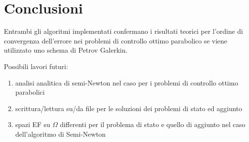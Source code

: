 \documentclass{beamer}
\theoremstyle{definition}
\theoremstyle{remark}
\theoremstyle{plain}
\theoremstyle{definition}
\begin{document}
\section{Conclusioni}
\begin{frame}
Entrambi gli algoritmi implementati confermano i risultati teorici per l'ordine di convergenza dell'errore nei problemi di controllo ottimo parabolico se viene utilizzato uno schema di Petrov Galerkin.

Possibili lavori futuri:
\begin{enumerate}
\item analisi analitica di semi-Newton nel caso per i problemi di controllo ottimo parabolici
\item scrittura/lettura su/da file per le soluzioni dei problemi di stato ed aggiunto
\item spazi EF su $\Omega$ differenti per il problema di stato e quello di aggiunto nel caso dell'algoritmo di Semi-Newton
\end{enumerate}

\end{frame}
\end{document}
